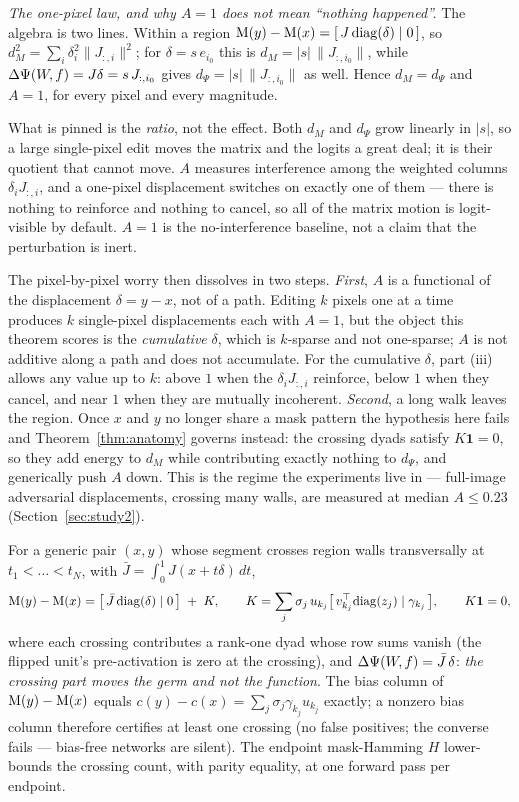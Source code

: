 \begin{clarifybox}
\emph{The one-pixel law, and why $A=1$ does not mean ``nothing happened''.}
The algebra is two lines. Within a region
$\mathrm{M}(y)-\mathrm{M}(x)=[\,J\,\mathrm{diag}(\delta)\mid0\,]$, so
$d_M^2=\sum_i\delta_i^2\|J_{:,i}\|^2$; for $\delta=s\,e_{i_0}$ this is
$d_M=|s|\,\|J_{:,i_0}\|$, while $\Delta\Psi(W\!,f)=J\delta=s\,J_{:,i_0}$ gives
$d_\Psi=|s|\,\|J_{:,i_0}\|$ as well. Hence $d_M=d_\Psi$ and $A=1$, for every pixel
and every magnitude.

What is pinned is the \emph{ratio}, not the effect. Both $d_M$ and $d_\Psi$ grow
linearly in $|s|$, so a large single-pixel edit moves the matrix and the
logits a great deal; it is their quotient that cannot move. $A$ measures
interference among the weighted columns $\delta_iJ_{:,i}$, and a one-pixel
displacement switches on exactly one of them --- there is nothing to reinforce
and nothing to cancel, so all of the matrix motion is logit-visible by
default. $A=1$ is the no-interference baseline, not a claim that the
perturbation is inert.

The pixel-by-pixel worry then dissolves in two steps. \emph{First}, $A$ is a
functional of the displacement $\delta=y-x$, not of a path. Editing $k$ pixels
one at a time produces $k$ single-pixel displacements each with $A=1$, but the
object this theorem scores is the \emph{cumulative} $\delta$, which is
$k$-sparse and not one-sparse; $A$ is not additive along a path and does not
accumulate. For the cumulative $\delta$, part (iii) allows any value up to
$k$: above $1$ when the $\delta_iJ_{:,i}$ reinforce, below $1$ when they
cancel, and near $1$ when they are mutually incoherent. \emph{Second}, a long
walk leaves the region. Once $x$ and $y$ no longer share a mask pattern the
hypothesis here fails and Theorem~\ref{thm:anatomy} governs instead: the
crossing dyads satisfy $K\mathbf 1=0$, so they add energy to $d_M$ while
contributing exactly nothing to $d_\Psi$, and generically push $A$ down. This is
the regime the experiments live in --- full-image adversarial displacements,
crossing many walls, are measured at median $A\le0.23$
(Section~\ref{sec:study2}).
\end{clarifybox}

\begin{theorem}\label{thm:anatomy}
For a generic pair $(x,y)$ whose segment crosses region walls transversally at
$t_1<\dots<t_N$, with $\bar J=\int_0^1J(x+t\delta)\,dt$,
\[
\mathrm{M}(y)-\mathrm{M}(x)=\bigl[\,\bar J\,\mathrm{diag}(\delta)\mid 0\,\bigr]
\;+\;K,\qquad
K=\sum_{j}\sigma_j\,u_{k_j}\bigl[\,v_{k_j}^{\top}\mathrm{diag}(z_j)\mid
\gamma_{k_j}\,\bigr],\qquad K\mathbf 1=0,
\]
where each crossing contributes a rank-one dyad whose row sums vanish (the
flipped unit's pre-activation is zero at the crossing), and
$\Delta\Psi(W\!,f)=\bar J\,\delta$: \emph{the crossing part moves the germ and not the
function}. The bias column of $\mathrm{M}(y)-\mathrm{M}(x)$ equals $c(y)-c(x)
=\sum_j\sigma_j\gamma_{k_j}u_{k_j}$ exactly; a nonzero bias column therefore
certifies at least one crossing (no false positives; the converse fails ---
bias-free networks are silent). The endpoint mask-Hamming $H$ lower-bounds the
crossing count, with parity equality, at one forward pass per endpoint.
\end{theorem}


